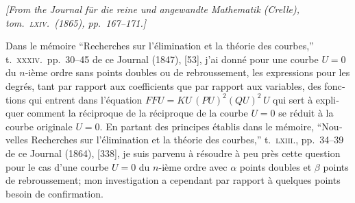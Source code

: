 \documentclass[11pt,a4paper]{article}
\begin{document}
\begin{otherlanguage}{french}

\noindent\textit{[From the \textit{Journal f\"ur die reine und angewandte Mathematik} (Crelle), tom.~\textsc{lxiv}.\ (1865), pp.~167--171.]}

\medskip

Dans le m\'emoire ``Recherches sur l'\'elimination et la th\'eorie des courbes,'' t.~\textsc{xxxiv}.\ pp.~30--45 de ce Journal (1847), [53], j'ai donn\'e pour une courbe $U = 0$ du $n$-i\`eme ordre sans points doubles ou de rebroussement, les expressions pour les degr\'es, tant par rapport aux coefficients que par rapport aux variables, des fonctions qui entrent dans l'\'equation $FFU = KU\,(PU)^{2}(QU)^{2}\,U$ qui sert \`a expliquer comment la r\'eciproque de la r\'eciproque de la courbe $U = 0$ se r\'eduit \`a la courbe originale $U = 0$. En partant des principes \'etablis dans le m\'emoire, ``Nouvelles Recherches sur l'\'elimination et la th\'eorie des courbes,'' t.~\textsc{lxiii}., pp.~34--39 de ce Journal (1864), [338], je suis parvenu \`a r\'esoudre \`a peu pr\`es cette question pour le cas d'une courbe $U = 0$ du $n$-i\`eme ordre avec $\alpha$ points doubles et $\beta$ points de rebroussement; mon investigation a cependant par rapport \`a quelques points besoin de confirmation.


\end{otherlanguage}
\end{document}
